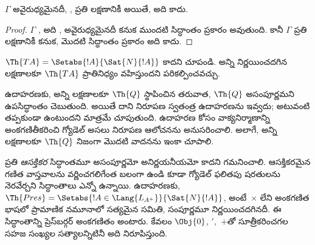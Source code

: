 \documentclass[../../../include/open-logic-section]{subfiles}
\begin{document}
\begin{cor}
$\Gamma$ అవైరుధ్యమైనదీ, , ప్రతి
 లక్షణానికీ
 అయితే, అది
 కాదు.
\end{cor}

\begin{proof}
$\Gamma$ , అది
, అవైరుధ్యమైనదీ కనుక ముందటి
సిద్ధాంతం ప్రకారం  అవుతుంది. కానీ
$\Gamma$ ప్రతి  లక్షణానికీ
 కనుక, మొదటి సిద్ధాంతం ప్రకారం
అది  కాదు.
\end{proof}

\begin{prob}
$\Th{TA}=\Setabs{!A}{\Sat{N}{!A}}$
 కాదని చూపండి. అన్ని నిర్ణయించదగిన
లక్షణాలకూ $\Th{TA}$ ప్రాతినిధ్యం వహిస్తుందని పరికల్పించవచ్చు.
\end{prob}

ఉదాహరణకు, అన్ని  లక్షణాలకూ $\Th{Q}$
 స్థాపించిన తరువాత, $\Th{Q}$
అసంపూర్ణమని ఉపసిద్ధాంతం చెబుతుంది. అయితే దాని నిరూపణ స్వతంత్ర
 ఉదాహరణను ఇవ్వదు; అటువంటి
 తప్పకుండా ఉంటుందని మాత్రమే చూపుతుంది. ఉదాహరణ
కోసం వాక్యనిర్మాణాన్ని అంకగణితీకరించి గ్యోడెల్ అసలు నిరూపణ ఆలోచనను అనుసరించాలి.
అలాగే, అన్ని  లక్షణాలకూ $\Th{Q}$ నిజంగా
 మొదటి వాదనను ఇంకా చూపాలి.

ప్రతి \emph{ఆసక్తికర} సిద్ధాంతమూ అసంపూర్ణమో అనిర్ణయనీయమో కాదని గమనించాలి.
ఆసక్తికరమైన గణిత వాస్తవాలను వర్ణించగలిగేంత బలంగా ఉండి కూడా గ్యోడెల్ ఫలితపు
షరతులను నెరవేర్చని సిద్ధాంతాలు ఎన్నో ఉన్నాయి. ఉదాహరణకు,
$\Th{Pres}=\Setabs{!A\in\Lang{L_{A^+}}}{\Sat{N}{!A}}$, అంటే~$\times$ లేని
అంకగణిత భాషలో ప్రామాణిక నమూనాలో సత్యమైన 
సమితి, సంపూర్ణమూ నిర్ణయించదగినదీ. ఈ సిద్ధాంతాన్ని ప్రెస్‌బర్గర్ అంకగణితం అంటారు.
కేవలం $\Obj{0}$, $\prime$,~$+$తో సూత్రీకరించగల సహజ సంఖ్యల సత్యాలన్నిటినీ అది
నిరూపిస్తుంది.
\end{document}
